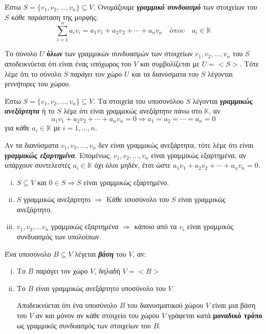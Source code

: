 \begin{dfn} Έστω $S=\{v_1,v_2,\ldots,v_n\}\subseteq V$. Ονομάζουμε \textbf{\textit{γραμμικό συνδυασμό}} των στοιχείων του $S$ κάθε παράσταση της μορφής:
\[
\sum_{i=1}^{n}a_iv_i=a_1v_1+a_2v_2+\cdots +a_nv_n \quad\text{όπου}\quad a_i\in \mathbb{K}
\]
\end{dfn}

Το σύνολο $U$ \textbf{όλων} των γραμμικών συνδυασμών των στοιχείων $v_1,v_2,\ldots, v_n$ του $S$ αποδεικνύεται ότι είναι ένας υπόχωρος του 
$V$ και συμβολίζεται με $U=<S>$. Τότε λέμε ότι το σύνολο $S$ \textit{παράγει} τον χώρο $U$ και τα διανύσματα του $S$ λέγονται \textit{γεννήτορες} του χώρου.

\begin{dfn} Έστω $S=\{v_1,v_2,\ldots,v_n\}\subseteq V$. Τα στοιχεία του υποσυνόλου $S$ λέγονται \textbf{\textit{γραμμικώς ανεξάρτητα}} ή το $S$ λέμε ότι είναι \textit{γραμμικώς ανεξάρτητο} πάνω στο $\mathbb{K}$, αν 
\[
a_1v_1+a_2v_2+\cdots +a_nv_n=0\Rightarrow a_1=a_2=\cdots=a_n=0
\]
για κάθε $a_i\in \mathbb{K}$ με  $i=1,\ldots,n$. 
\end{dfn}

\begin{dfn} Αν τα διανύσματα $v_1,v_2,\ldots,v_n$ δεν είναι γραμμικώς ανεξάρτητα, τότε λέμε ότι είναι \textbf{\textit{γραμμικώς εξαρτημένα}}. Επομένως, $v_1,v_2,\ldots,v_n$ είναι γραμμικώς εξαρτημένα, αν υπάρχουν  συντελεστές $a_i\in \mathbb{K}$ όχι όλοι μηδέν, έτσι ώστε $a_1v_1+a_2v_2+\cdots +a_nv_n=0$.
\end{dfn}

\begin{prop}
  \item {}
\begin{enumerate}[i.]
\item $S\subseteq V$ και $0\in S\Rightarrow S$ είναι γραμμικώς εξαρτημένο.
\item $S$ γραμμικώς ανεξάρτητο $\Rightarrow$ Κάθε υποσύνολο του $S$ είναι γραμμικώς ανεξάρτητο.
\item $v_1,v_2,\ldots v_n$ γραμμικώς εξαρτημένα $\Rightarrow$ κάποιο από τα $v_i$ είναι γραμμικός συνδυασμός των υπολοίπων.
\end{enumerate} 
\end{prop}

\begin{dfn} Ένα υποσύνολο $B\subseteq V$ λέγεται \textbf{\textit{βάση}} του $V$, αν:
\begin{enumerate}[i.]
\item Το $B$ παράγει τον χώρο $V$, δηλαδή $V=<B>$ 
\item Το $B$ είναι γραμμικώς ανεξάρτητο υποσύνολο του $V$.

Αποδεικνύεται ότι ένα υποσύνολο $B$ του διανυσματικού χώρου $V$ είναι μια βάση του $V$ αν και μόνον αν κάθε στοιχείο του χώρου $V$ γράφεται κατά \textbf{μοναδικό τρόπο} ως γραμμικός συνδυασμός των στοιχείων του $Β$.
\end{enumerate}
\end{dfn}


